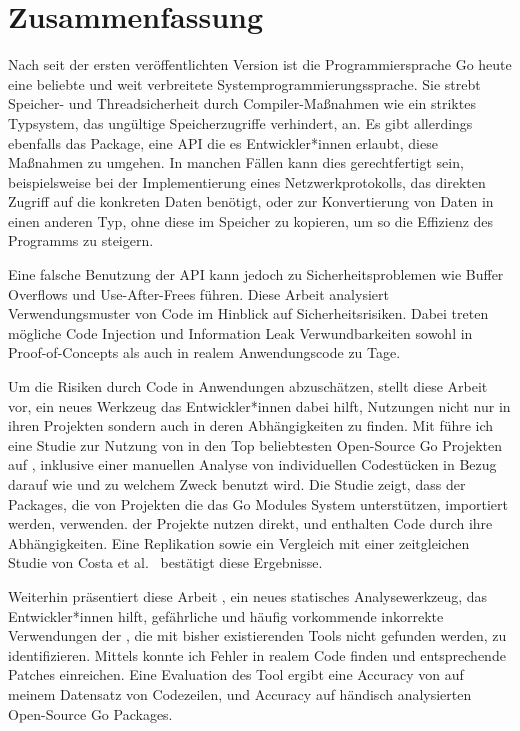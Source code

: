\chapter*{Zusammenfassung}

Nach  seit der ersten veröffentlichten Version ist die Programmiersprache Go heute eine
beliebte und weit verbreitete Systemprogrammierungssprache.
Sie strebt Speicher- und Threadsicherheit durch Compiler-Maßnahmen wie ein striktes Typsystem, das
ungültige Speicherzugriffe verhindert, an.
Es gibt allerdings ebenfalls das \unsafe{} Package, eine API die es Entwickler*innen erlaubt, diese
Maßnahmen zu umgehen.
In manchen Fällen kann dies gerechtfertigt sein, beispielsweise bei der Implementierung eines
Netzwerkprotokolls, das direkten Zugriff auf die konkreten Daten benötigt, oder zur Konvertierung von Daten in einen
anderen Typ, ohne diese im Speicher zu kopieren, um so die Effizienz des Programms zu steigern.

Eine falsche Benutzung der \unsafe{} API kann jedoch zu Sicherheitsproblemen wie Buffer Overflows und Use-After-Frees
führen.
Diese Arbeit analysiert Verwendungsmuster von \unsafe{} Code im Hinblick auf Sicherheitsrisiken.
Dabei treten mögliche Code Injection und Information Leak Verwundbarkeiten sowohl in Proof-of-Concepts als auch in
realem Anwendungscode zu Tage.

Um die Risiken durch \unsafe{} Code in Anwendungen abzuschätzen, stellt diese Arbeit \toolGeiger{} vor, ein neues
Werkzeug das Entwickler*innen dabei hilft, \unsafe{} Nutzungen nicht nur in ihren Projekten sondern auch in deren
Abhängigkeiten zu finden.
Mit \toolGeiger{} führe ich eine Studie zur Nutzung von \unsafe{} in den Top \projsTotal{} beliebtesten Open-Source Go
Projekten auf \github{}, inklusive einer manuellen Analyse von \numberLabeledCodeSnippets{} individuellen Codestücken
in Bezug darauf wie und zu welchem Zweck \unsafe{} benutzt wird.
Die Studie zeigt, dass \percentageUnsafePackages{} der Packages, die von Projekten die das Go Modules System
unterstützen, importiert werden, \unsafe{} verwenden.
\percentageUnsafeProjects{} der Projekte nutzen \unsafe{} direkt, und \percentageUnsafeTransitiveWithDependencies{}
enthalten \unsafe{} Code durch ihre Abhängigkeiten.
Eine Replikation sowie ein Vergleich mit einer zeitgleichen Studie von Costa et al.~\cite{costa2020} bestätigt diese
Ergebnisse.

Weiterhin präsentiert diese Arbeit \toolSafer{}, ein neues statisches Analysewerkzeug, das Entwickler*innen hilft,
 gefährliche und häufig vorkommende inkorrekte Verwendungen der \unsafe{}, die mit bisher existierenden
Tools nicht gefunden werden, zu identifizieren.
Mittels \toolSafer{} konnte ich \numberBugsFixed{} Fehler in realem Code finden und entsprechende Patches einreichen.
Eine Evaluation des Tool ergibt eine Accuracy von \goSaferEvaluationDatasetGosaferAccuracy{} auf meinem Datensatz von
\unsafe{} Codezeilen, und \goSaferEvaluationPackagesGosaferAccuracy{} Accuracy auf händisch analysierten Open-Source
Go Packages.
